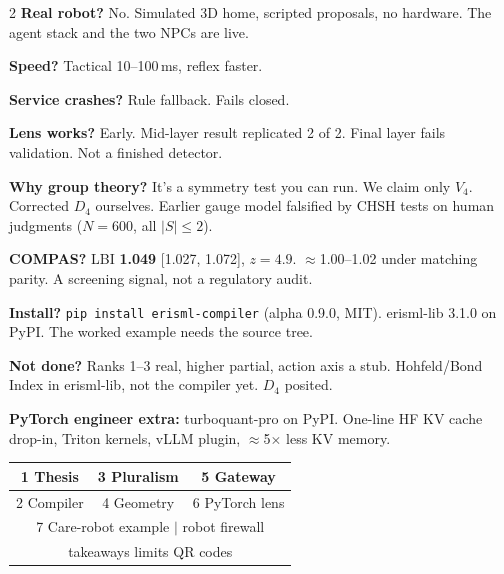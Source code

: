\documentclass[12pt]{extarticle}
\newcommand{\hd}[1]{\par\vspace{4pt}{\color{violet}\bfseries\large #1}\par\vspace{1pt}}
\begin{document}
\begin{multicols}{2}
\textbf{Real robot?} No. Simulated 3D home, scripted proposals, no hardware. The agent stack and
the two NPCs are live.

\textbf{Speed?} Tactical 10--100\,ms, reflex faster.

\textbf{Service crashes?} Rule fallback. Fails closed.

\textbf{Lens works?} Early. Mid-layer result replicated 2 of 2. Final layer fails validation.
Not a finished detector.

\textbf{Why group theory?} It's a symmetry test you can run. We claim only $V_4$. Corrected $D_4$
ourselves. Earlier gauge model falsified by CHSH tests on human judgments ($N{=}600$, all $|S|\le 2$).

\textbf{COMPAS?} LBI \textbf{1.049} [1.027, 1.072], $z=4.9$. $\approx$1.00--1.02 under
matching parity. A screening signal, not a regulatory audit.

\textbf{Install?} \texttt{pip install erisml-compiler} (alpha 0.9.0, MIT). erisml-lib 3.1.0 on
PyPI. The worked example needs the source tree.

\textbf{Not done?} Ranks 1--3 real, higher partial, action axis a stub. Hohfeld/Bond Index in
erisml-lib, not the compiler yet. $D_4$ posited.

\textbf{PyTorch engineer extra:} turboquant-pro on PyPI. One-line HF KV cache drop-in, Triton
kernels, vLLM plugin, $\approx$5$\times$ less KV memory.

\hd{Panel map}
\begin{tabular}{|c|c|c|}\hline
1 Thesis & 3 Pluralism & 5 Gateway\\\hline
2 Compiler & 4 Geometry & 6 PyTorch lens\\\hline
\multicolumn{3}{|c|}{7 Care-robot example $\mid$ robot firewall}\\\hline
\multicolumn{3}{|c|}{takeaways \textperiodcentered{} limits \textperiodcentered{} QR codes}\\\hline
\end{tabular}
\end{multicols}
\end{document}
